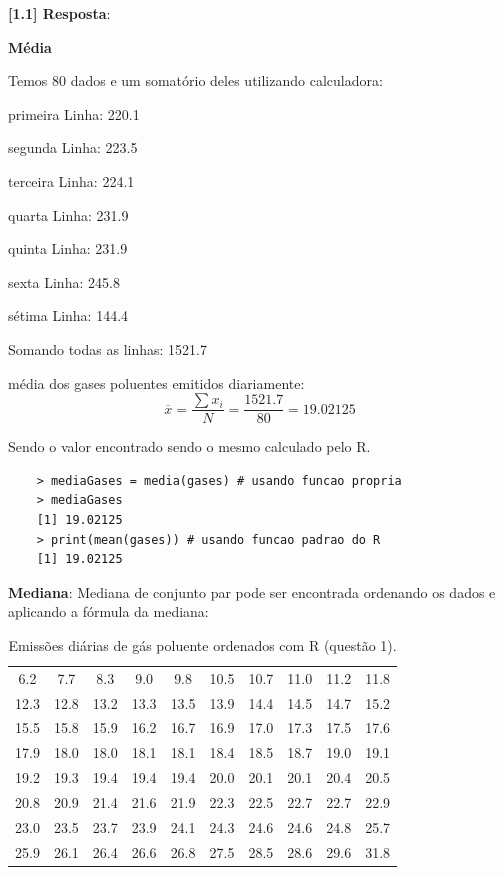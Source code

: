 \documentclass[a4paper,11pt]{article}
\begin{document}
\begin{description}

\item \textbf{[1.1] Resposta}:

\textbf{Média}

Temos 80 dados e um somatório deles utilizando calculadora:
\item primeira Linha: 220.1
\item segunda Linha: 223.5
\item terceira Linha: 224.1
\item quarta Linha: 231.9
\item quinta Linha: 231.9
\item sexta Linha: 245.8
\item sétima Linha: 144.4

Somando todas as linhas: 1521.7

média dos gases poluentes emitidos diariamente: 
\[\overline{x} = \frac{\sum x_i}{N} = \frac{1521.7}{80} = 19.02125\]

Sendo o valor encontrado sendo o mesmo calculado pelo R.

\begin{lstlisting}
    > mediaGases = media(gases) # usando funcao propria
    > mediaGases
    [1] 19.02125
    > print(mean(gases)) # usando funcao padrao do R
    [1] 19.02125
    \end{lstlisting}

\textbf{Mediana}:
Mediana de conjunto par pode ser encontrada ordenando os dados e aplicando a fórmula da mediana:


\begin{table}[H]
    \centering
    \begin{tabular}{cccccccccc}
        \hline
        6.2 & 7.7 & 8.3 & 9.0 & 9.8 & 10.5 & 10.7 & 11.0 & 11.2 & 11.8 \\
        12.3 & 12.8 & 13.2 & 13.3 & 13.5 & 13.9 & 14.4 & 14.5 & 14.7 & 15.2 \\
        15.5 & 15.8 & 15.9 & 16.2 & 16.7 & 16.9 & 17.0 & 17.3 & 17.5 & 17.6 \\
        17.9 & 18.0 & 18.0 & 18.1 & 18.1 & 18.4 & 18.5 & 18.7 & 19.0 & 19.1 \\
        19.2 & 19.3 & 19.4 & 19.4 & 19.4 & 20.0 & 20.1 & 20.1 & 20.4 & 20.5 \\
        20.8 & 20.9 & 21.4 & 21.6 & 21.9 & 22.3 & 22.5 & 22.7 & 22.7 & 22.9 \\
        23.0 & 23.5 & 23.7 & 23.9 & 24.1 & 24.3 & 24.6 & 24.6 & 24.8 & 25.7 \\
        25.9 & 26.1 & 26.4 & 26.6 & 26.8 & 27.5 & 28.5 & 
        28.6 & 29.6 & 31.8 \\
        \hline
    \end{tabular}
    \caption{Emissões diárias de gás poluente ordenados com R (questão 1).}
    \label{tab:q1}
\end{table}


\end{description}
\end{document}
